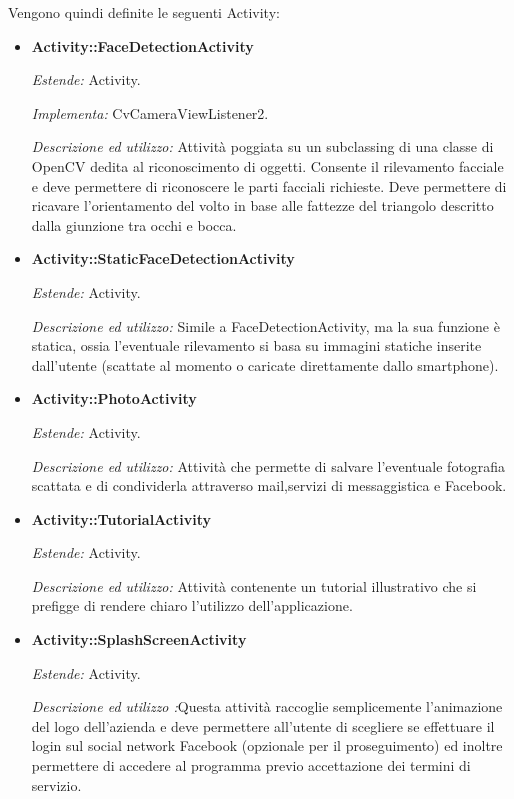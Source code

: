 Vengono quindi definite le seguenti Activity:
\begin{itemize}


\item \textbf{Activity::FaceDetectionActivity}

\textit{Estende:} Activity.

\textit{Implementa:} CvCameraViewListener2.

\textit{Descrizione ed utilizzo:} Attività poggiata su un subclassing di una classe di OpenCV dedita al riconoscimento di oggetti. Consente il rilevamento facciale e deve permettere di riconoscere le parti facciali richieste. Deve permettere di ricavare l'orientamento del volto in base alle fattezze del triangolo descritto dalla giunzione tra occhi e bocca.

\item \textbf{Activity::StaticFaceDetectionActivity}

\textit{Estende:} Activity. 

\textit{Descrizione ed utilizzo:} Simile a FaceDetectionActivity, ma la sua funzione è statica, ossia l'eventuale rilevamento si basa su immagini statiche inserite dall'utente (scattate al momento o caricate direttamente dallo smartphone).

\item \textbf{Activity::PhotoActivity}

\textit{Estende:} Activity.

\textit{Descrizione ed utilizzo:} Attività che permette di salvare l'eventuale fotografia scattata e di condividerla attraverso mail,servizi di messaggistica e Facebook.

\item \textbf{Activity::TutorialActivity}

\textit{Estende:} Activity.

\textit{Descrizione ed utilizzo:} Attività contenente un tutorial illustrativo che si prefigge di rendere chiaro l'utilizzo dell'applicazione.

\item \textbf{Activity::SplashScreenActivity}

\textit{Estende:} Activity.

\textit{Descrizione ed utilizzo :}Questa attività raccoglie semplicemente l'animazione del logo dell'azienda e deve permettere all'utente di scegliere se effettuare il login sul social network Facebook (opzionale per il proseguimento) ed inoltre permettere di accedere al programma previo accettazione dei termini di servizio.

\end{itemize}

